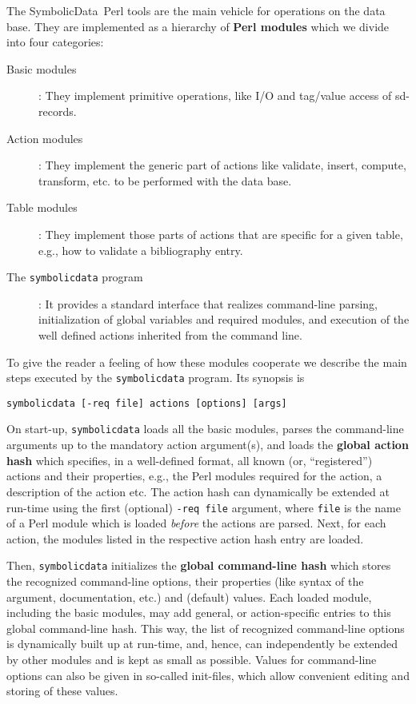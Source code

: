 \documentclass[11pt,a4paper]{article}
\newcommand{\SD}{{\sc Symbolic\-Data}}
\begin{document}
The \SD\ Perl tools are the main vehicle for operations on the data base.
They are implemented as a hierarchy of {\bf Perl modules} which we 
divide into four categories:
\begin{description}
\item[Basic modules]: They implement primitive operations, like I/O
and tag/value access of sd-records.
\item[Action modules]: They implement the generic part of actions like
validate, insert, compute, transform, etc. to be performed with the
data base.
\item[Table modules]: They implement those parts of actions that are
specific for a given table, e.g., how to validate a bibliography
entry.
\item[The {\tt symbolicdata} program]: It provides a standard
interface that realizes command-line parsing, initialization of global
variables and required modules, and execution of the well defined
actions inherited from the command line.
\end{description}

To give the reader a feeling of how these modules cooperate we describe
the main steps executed by the {\tt symbolicdata} program. Its
synopsis is
\begin{center}
\mbox{\tt symbolicdata [-req file] actions [options] [args]}
\end{center}
On start-up, {\tt symbolicdata} loads all the basic modules, parses
the command-line arguments up to the mandatory action argument(s), and
loads the {\bf global action hash} which specifies, in a well-defined
format, all known (or, ``registered'') actions and their properties,
e.g., the Perl modules required for the action, a description of the
action etc. The action hash can dynamically be extended at run-time
using the first (optional) {\tt -req file} argument, where {\tt file}
is the name of a Perl module which is loaded {\em before} the actions
are parsed.  Next, for each action, the modules listed in the
respective action hash entry are loaded.

Then, {\tt symbolicdata} initializes the {\bf global command-line
hash} which stores the recognized command-line options, their
properties (like syntax of the argument, documentation, etc.) and
(default) values.  Each loaded module, including the basic modules, may add
general, or action-specific entries to this global command-line hash.
This way, the list of recognized command-line options is dynamically
built up at run-time, and, hence, can independently be extended by
other modules and is kept as small as possible. Values for
command-line options can also be given in so-called init-files, which
allow convenient editing and storing of these values.
\end{document}
